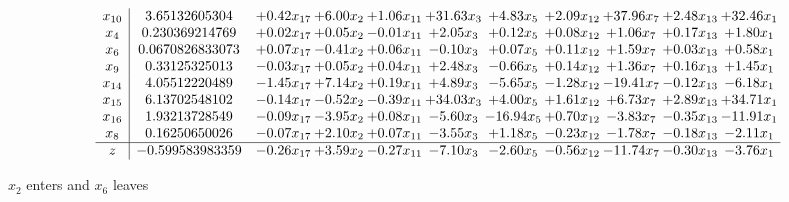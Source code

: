 \documentclass[9pt]{article}
\begin{document}
 \[\begin{array}{c| c c@{\hskip 2pt} c@{\hskip 2pt} c@{\hskip 2pt} c@{\hskip 2pt} c@{\hskip 2pt} c@{\hskip 2pt} c@{\hskip 2pt} c@{\hskip 2pt} c@{\hskip 2pt} }
 x_{10}   &  3.65132605304 & +  0.42 x_{17} & +  6.00 x_{2} & +  1.06 x_{11} & + 31.63 x_{3} & +  4.83 x_{5} & +  2.09 x_{12} & + 37.96 x_{7} & +  2.48 x_{13} & + 32.46 x_{1}\\
 x_{4}   &  0.230369214769 & +  0.02 x_{17} & +  0.05 x_{2} & -0.01 x_{11} & +  2.05 x_{3} & +  0.12 x_{5} & +  0.08 x_{12} & +  1.06 x_{7} & +  0.17 x_{13} & +  1.80 x_{1}\\
 x_{6}   &  0.0670826833073 & +  0.07 x_{17} & -0.41 x_{2} & +  0.06 x_{11} & -0.10 x_{3} & +  0.07 x_{5} & +  0.11 x_{12} & +  1.59 x_{7} & +  0.03 x_{13} & +  0.58 x_{1}\\
 x_{9}   &  0.33125325013 & -0.03 x_{17} & +  0.05 x_{2} & +  0.04 x_{11} & +  2.48 x_{3} & -0.66 x_{5} & +  0.14 x_{12} & +  1.36 x_{7} & +  0.16 x_{13} & +  1.45 x_{1}\\
 x_{14}   &  4.05512220489 & -1.45 x_{17} & +  7.14 x_{2} & +  0.19 x_{11} & +  4.89 x_{3} & -5.65 x_{5} & -1.28 x_{12} & -19.41 x_{7} & -0.12 x_{13} & -6.18 x_{1}\\
 x_{15}   &  6.13702548102 & -0.14 x_{17} & -0.52 x_{2} & -0.39 x_{11} & + 34.03 x_{3} & +  4.00 x_{5} & +  1.61 x_{12} & +  6.73 x_{7} & +  2.89 x_{13} & + 34.71 x_{1}\\
 x_{16}   &  1.93213728549 & -0.09 x_{17} & -3.95 x_{2} & +  0.08 x_{11} & -5.60 x_{3} & -16.94 x_{5} & +  0.70 x_{12} & -3.83 x_{7} & -0.35 x_{13} & -11.91 x_{1}\\
 x_{8}   &  0.16250650026 & -0.07 x_{17} & +  2.10 x_{2} & +  0.07 x_{11} & -3.55 x_{3} & +  1.18 x_{5} & -0.23 x_{12} & -1.78 x_{7} & -0.18 x_{13} & -2.11 x_{1}\\
\hline
z    &  -0.599583983359 & -0.26 x_{17} & +  3.59 x_{2} & -0.27 x_{11} & -7.10 x_{3} & -2.60 x_{5} & -0.56 x_{12} & -11.74 x_{7} & -0.30 x_{13} & -3.76 x_{1}\\
\end{array}\]


 $ x_{2} $ enters and $ x_{6} $ leaves 
\end{document}

